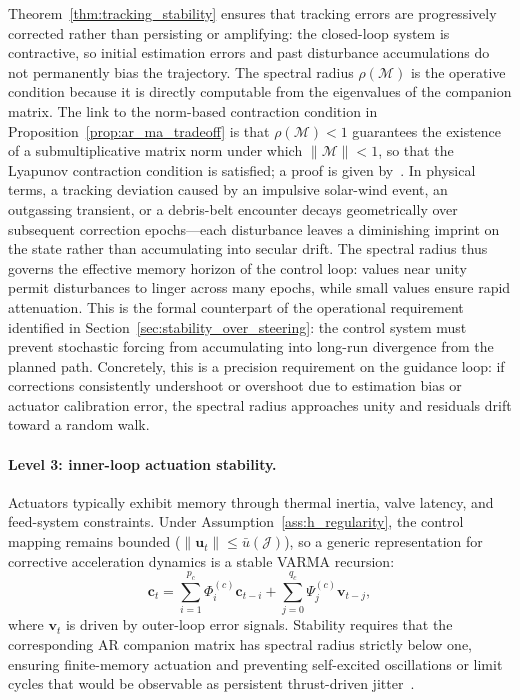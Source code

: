 \documentclass{article}
\begin{document}
Theorem~\ref{thm:tracking_stability} ensures that tracking errors are progressively corrected rather than persisting or amplifying: the closed-loop system is contractive, so initial estimation errors and past disturbance accumulations do not permanently bias the trajectory. The spectral radius $\rho(\mathcal{M})$ is the operative condition because it is directly computable from the eigenvalues of the companion matrix. The link to the norm-based contraction condition in Proposition~\ref{prop:ar_ma_tradeoff} is that $\rho(\mathcal{M})<1$ guarantees the existence of a submultiplicative matrix norm under which $\|\mathcal{M}\|<1$, so that the Lyapunov contraction condition is satisfied; a proof is given by~\cite{andree2022causal}. In physical terms, a tracking deviation caused by an impulsive solar-wind event, an outgassing transient, or a debris-belt encounter decays geometrically over subsequent correction epochs---each disturbance leaves a diminishing imprint on the state rather than accumulating into secular drift. The spectral radius thus governs the effective memory horizon of the control loop: values near unity permit disturbances to linger across many epochs, while small values ensure rapid attenuation. This is the formal counterpart of the operational requirement identified in Section~\ref{sec:stability_over_steering}: the control system must prevent stochastic forcing from accumulating into long-run divergence from the planned path. Concretely, this is a precision requirement on the guidance loop: if corrections consistently undershoot or overshoot due to estimation bias or actuator calibration error, the spectral radius approaches unity and residuals drift toward a random walk.

\paragraph{Level 3: inner-loop actuation stability.}
Actuators typically exhibit memory through thermal inertia, valve latency, and feed-system constraints. Under Assumption~\ref{ass:h_regularity}, the control mapping remains bounded ($\|\mathbf{u}_t\|\le\bar{u}(\mathcal{J})$), so a generic representation for corrective acceleration dynamics is a stable VARMA recursion:
\begin{equation}
\mathbf{c}_t=\sum_{i=1}^{p_c}\Phi^{(c)}_i\mathbf{c}_{t-i}+\sum_{j=0}^{q_c}\Psi^{(c)}_j\mathbf{v}_{t-j},
\label{eq:c_varma}
\end{equation}
where $\mathbf{v}_t$ is driven by outer-loop error signals. Stability requires that the corresponding AR companion matrix has spectral radius strictly below one, ensuring finite-memory actuation and preventing self-excited oscillations or limit cycles that would be observable as persistent thrust-driven jitter~\cite{wie2008spacecraft}.
\end{document}
